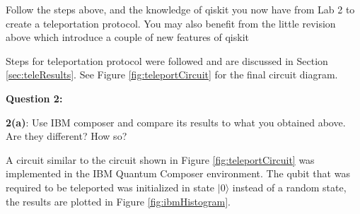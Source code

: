 Follow the steps above, and the knowledge of qiskit you now have from Lab 2 to create a teleportation protocol. You may also benefit from the little revision above which introduce a couple of new features of qiskit

Steps for teleportation protocol were followed and are discussed in Section \ref{sec:teleResults}. See Figure \ref{fig:teleportCircuit} for the final circuit diagram.

\textbf{Question 2:}

\textbf{2(a)}: Use IBM composer and compare its results to what you obtained above. Are they different? How so?

A circuit similar to the circuit shown in Figure \ref{fig:teleportCircuit} was implemented in the IBM Quantum Composer environment. The qubit that was required to be teleported was initialized in state $|0\rangle$ instead of a random state, the results are plotted in Figure \ref{fig:ibmHistogram}.



